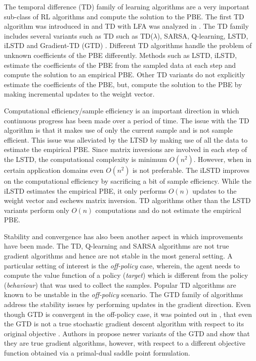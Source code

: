 The temporal difference (TD) family of learning algorithms are a very important sub-class of RL algorithms and compute the solution to the PBE. The first TD algorithm was introduced in \cite{} and TD with LFA was analyzed in \cite{}. The TD family includes several variants such as TD such as TD($\lambda$), SARSA, Q-learning, LSTD, iLSTD and Gradient-TD (GTD) \cite{}.
Different TD algorithms handle the problem of unknown coefficients of the PBE differently. Methods such as LSTD, iLSTD, estimate the coefficients of the PBE from the sampled data at each step and compute the solution to an empirical PBE. Other TD variants do not explicitly estimate the coefficients of the PBE, but, compute the solution to the PBE by making incremental updates to the weight vector.\par
Computational efficiency/sample efficiency is an important direction in which continuous progress has been made over a period of time. The issue with the TD algorithm is that it makes use of only the current sample and is not sample efficient. This issue was alleviated by the LTSD by making use of all the data to estimate the empirical PBE. Since matrix inversions are involved in each step of the LSTD, the computational complexity is minimum $O(n^2)$. However, when in certain application domains even $O(n^2)$ is not preferable. The iLSTD improves on the computational efficiency by sacrificing a bit of sample efficiency. While the iLSTD estimates the empirical PBE, it only performs $O(n)$ updates to the weight vector and eschews matrix inversion. TD algorithms other than the LSTD variants perform only $O(n)$ computations and do not estimate the empirical PBE.\par
Stability and convergence has also been another aspect in which improvements have been made. The TD, Q-learning and SARSA algorithms are not true gradient algorithms and hence are not stable in the most general setting. A particular setting of interest is the \emph{off-policy} case, wherein, the agent needs to compute the value function of a policy (\emph{target}) which is different from the policy (\emph{behaviour}) that was used to collect the samples. Popular TD algorithms are known to be unstable in the \emph{off-policy} scenario. The GTD family of algorithms address the stability issues by performing updates in the gradient direction. Even though GTD is convergent in the off-policy case, it was pointed out in \cite{}, that even the GTD is not a true stochastic gradient descent algorithm with respect to its original objective \cite{}. Authors in \cite{} propose newer variants of the GTD and show that they are true gradient algorithms, however, with respect to a different objective function obtained via a primal-dual saddle point formulation.\par
